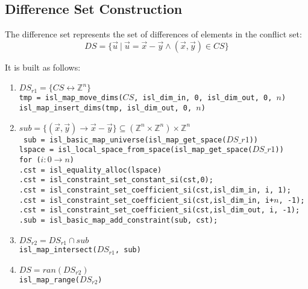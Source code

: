 \documentclass{article}
\begin{document}
\subsection{Difference Set Construction}

The difference set represents the set of differences of elements in the conflict
set:
$$DS = \{ \vec{u} ~|~ \vec{u} = \vec{x} - \vec{y} \wedge (\vec{x},\vec{y}) \in
CS \}$$

It is built as follows:
\begin{enumerate}
  \item $DS_{r1} = \{ CS \leftrightarrow \mathbb{Z}^n \}$\\
{\tt tmp = isl\_map\_move\_dims($CS$, isl\_dim\_in, 0, isl\_dim\_out, 0, $n$)\\
isl\_map\_insert\_dims(tmp, isl\_dim\_out, 0, $n$)}
  \item $sub = \{ (\vec{x},\vec{y}) \rightarrow \vec{x} - \vec{y} \} \subseteq
  (\mathbb{Z}^n \times \mathbb{Z}^n) \times \mathbb{Z}^n$\\
{\tt 
sub = isl\_basic\_map\_universe(isl\_map\_get\_space($DS\_{r1}$))\\
lspace = isl\_local\_space\_from\_space(isl\_map\_get\_space($DS\_{r1}$))\\
for ($i : 0 \rightarrow n$)\\
.\hspace{0.7cm}cst = isl\_equality\_alloc(lspace)\\
.\hspace{0.7cm}cst = isl\_constraint\_set\_constant\_si(cst,0);\\
.\hspace{0.7cm}cst = isl\_constraint\_set\_coefficient\_si(cst,isl\_dim\_in, i, 1);\\
.\hspace{0.7cm}cst = isl\_constraint\_set\_coefficient\_si(cst,isl\_dim\_in, i+$n$, -1);\\
.\hspace{0.7cm}cst = isl\_constraint\_set\_coefficient\_si(cst,isl\_dim\_out, i, -1);\\
.\hspace{0.7cm}sub = isl\_basic\_map\_add\_constraint(sub, cst);\\
}
  \item $DS_{r2} = DS_{r1} \cap sub$\\
{\tt isl\_map\_intersect($DS_{r1}$, sub)}
  \item $DS = ran(DS_{r2})$\\
{\tt isl\_map\_range($DS_{r2}$)}
\end{enumerate}
\end{document}
